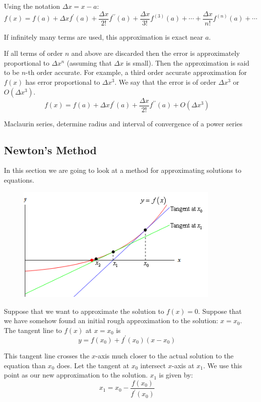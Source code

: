 Using the notation $\Delta x = x-a$:
\[ f(x)=f(a)+\Delta xf^\prime(a)+\frac{\Delta x}{2!}f^{\prime\prime}(a) + \frac{\Delta x}{3!}f^{(3)}(a) + \cdots + \frac{\Delta x}{n!}f^{(n)}(a) + \cdots \]

If infinitely many terms are used, this approximation is exact near $a$.

If all terms of order $n$ and above are discarded then the error is approximately proportional to $\Delta x^n$ (assuming that $\Delta x$ is small). Then the approximation is said to be $n$-th order accurate. For example, a third order accurate approximation for $f(x)$ has error proportional to $\Delta x^3$. We say that  the error is of order $\Delta x^3$ or $O(\Delta x^3)$.
\[ f(x)=f(a)+\Delta xf^\prime(a)+\frac{\Delta x}{2!}f^{\prime\prime}(a) + O(\Delta x^3) \]


Maclaurin series,  determine radius and interval
of convergence of a power series

\subsection{Newton's Method}
In this section we are going to look at a method for approximating solutions to equations.

\begin{figure}[H]
    \centering
    \includegraphics[width=10cm]{images/newton_method.png}
\end{figure}

Suppose that we want to approximate the solution to $f(x)=0$. Suppose that we have somehow found an initial rough approximation to the solution: $x=x_0$. The tangent line to $f(x)$ at $x=x_0$ is
\[ y = f(x_0) + f^\prime(x_0)(x-x_0) \]

This tangent line crosses the $x$-axis much closer to the actual solution to the equation than $x_0$ does. Let the tangent at $x_0$ intersect $x$-axis at $x_1$. We use this point as our new approximation to the solution. $x_1$ is given by:
\[ x_1 = x_0 - \frac{f(x_0)}{f^\prime(x_0)} \]

